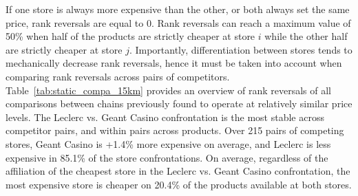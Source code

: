 \documentclass[english]{article}
\begin{document}
If one store is always more expensive than the other, or both always set the same price, rank reversals are equal to 0. Rank reversals can reach a maximum value of 50\% when half of the products are strictly cheaper at store $i$ while the other half are strictly cheaper at store $j$. Importantly, differentiation between stores tends to mechanically decrease rank reversals, hence it must be taken into account when comparing rank reversals across pairs of competitors. Table~\ref{tab:static_compa_15km} provides an overview of rank reversals of all comparisons between chains previously found to operate at relatively similar price levels. The Leclerc vs. Geant Casino confrontation is the most stable across competitor pairs, and within pairs across products. Over 215 pairs of competing stores, Geant Casino is +1.4\% more expensive on average, and Leclerc is less expensive in 85.1\% of the store confrontations. On average, regardless of the affiliation of the cheapest store in the Leclerc vs. Geant Casino confrontation, the most expensive store is cheaper on 20.4\% of the products available at both stores.
\end{document}
